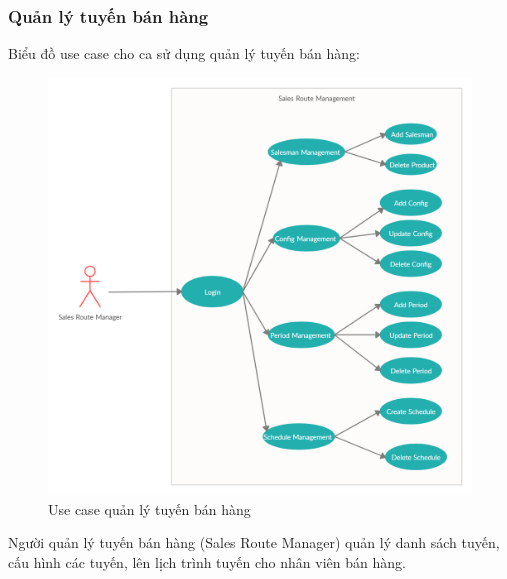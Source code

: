 \subsubsection{Quản lý tuyến bán hàng}
Biểu đồ use case cho ca sử dụng quản lý tuyến bán hàng:
\begin{figure}[H]
\centering
\includegraphics[width=14cm]{images/use-case/sales-route.png}
\caption{Use case quản lý tuyến bán hàng}
\end{figure}
Người quản lý tuyến bán hàng (Sales Route Manager) quản lý danh
sách tuyến, cấu hình các tuyến, lên lịch trình tuyến cho
nhân viên bán hàng.

